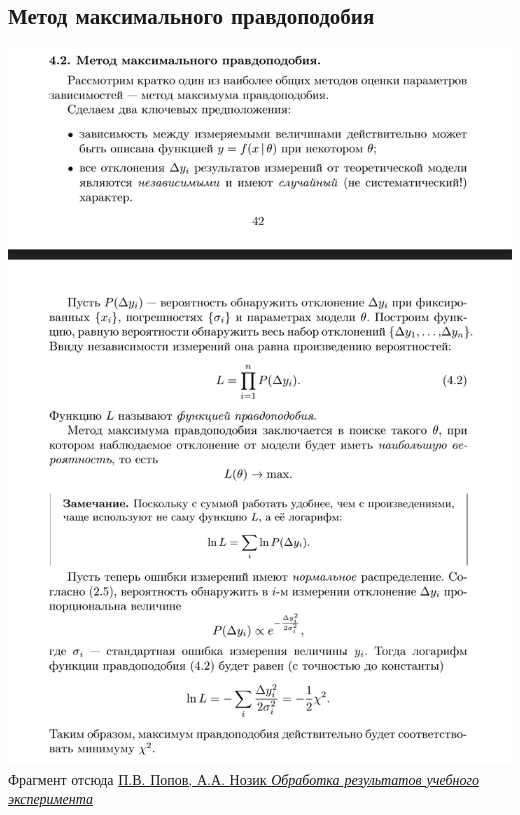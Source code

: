 \documentclass[a4paper,12pt]{article}
\begin{document}
\subsection{Метод максимального правдоподобия}
\newpage
\thispagestyle{empty}
\includegraphics[width=0.8\paperwidth, center]{метод максимального правдоподобия}
Фрагмент отсюда \href{https://drive.google.com/file/d/11M5yI5y8wDZ0q8MtQzv-y28AN6DKgBDz/view}{П.В. Попов, А.А. Нозик \textit{Обработка результатов учебного эксперимента}}
\end{document}
